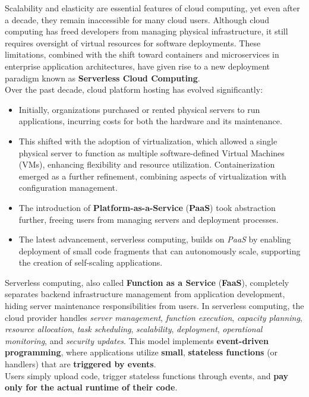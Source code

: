 Scalability and elasticity are essential features of cloud computing, yet even after a decade, they remain inaccessible for many cloud users. Although cloud computing has freed developers from managing physical infrastructure, it still requires oversight of virtual resources for software deployments. These limitations, combined with the shift toward containers and microservices in enterprise application architectures, have given rise to a new deployment paradigm known as \textbf{Serverless Cloud Computing}\cite{banaei2022etas}.\vspace{14pt}\\
Over the past decade, cloud platform hosting has evolved significantly\cite{djemame2020open}:
\begin{itemize}
    \item Initially, organizations purchased or rented physical servers to run applications, incurring costs for both the hardware and its maintenance.
    \item This shifted with the adoption of virtualization, which allowed a single physical server to function as multiple software-defined Virtual Machines (VMs), enhancing flexibility and resource utilization. Containerization emerged as a further refinement, combining aspects of virtualization with configuration management.
    \item The introduction of \textbf{Platform-as-a-Service} (\textbf{PaaS}) took abstraction further, freeing users from managing servers and deployment processes.
    \item The latest advancement, serverless computing, builds on \textit{PaaS} by enabling deployment of small code fragments that can autonomously scale, supporting the creation of self-scaling applications.
\end{itemize}
Serverless computing, also called \textbf{Function as a Service} (\textbf{FaaS}), completely separates backend infrastructure management from application development, hiding server maintenance responsibilities from users. In serverless computing, the cloud provider handles \textit{server management}, \textit{function execution}, \textit{capacity planning}, \textit{resource allocation}, \textit{task scheduling}, \textit{scalability}, \textit{deployment}, \textit{operational monitoring}, and \textit{security updates}. This model implements \textbf{event-driven programming}, where applications utilize \textbf{small}, \textbf{stateless functions} (or handlers) that are \textbf{triggered by events}.\\
Users simply upload code, trigger stateless functions through events, and \textbf{pay only for the actual runtime of their code}.\vspace{14pt}\\
